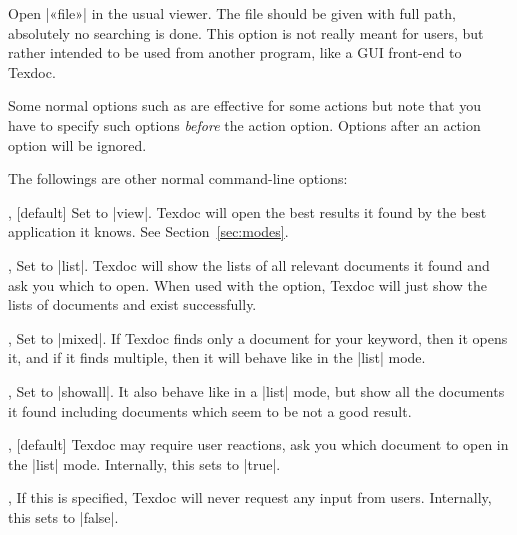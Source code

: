 \documentclass{texdoc-doc}
\begin{document}
\begin{clopt}{}
Open |«file»| in the usual viewer. The file should be given with full path,
absolutely no searching is done. This option is not really meant for users,
but rather intended to be used from another program, like a GUI front-end to
Texdoc.
\end{clopt}

Some normal options such as  are effective for some actions but note
that you have to specify such options \emph{before} the action option. Options
after an action option will be ignored.

The followings are other normal command-line options:

\begin{clopt}{, }[default]
Set  to |view|. Texdoc will open the best results it found by the best
application it knows. See Section~\ref{sec:modes}.
\end{clopt}

\begin{clopt}{, }
Set  to |list|. Texdoc will show the lists of all relevant documents
it found and ask you which to open. When used with the 
option, Texdoc will just show the lists of documents and exist successfully.
\end{clopt}

\begin{clopt}{, }
Set  to |mixed|. If Texdoc finds only a document for your keyword,
then it opens it, and if it finds multiple, then it will behave like in the
|list| mode.
\end{clopt}

\begin{clopt}{, }
Set  to |showall|. It also behave like in a |list| mode, but show all
the documents it found including documents which seem to be not a good result.
\end{clopt}

\begin{clopt}{, }[default]
Texdoc may require user reactions, \eg ask you which document to open in the
|list| mode. Internally, this sets  to |true|.
\end{clopt}

\begin{clopt}{, }
If this is specified, Texdoc will never request any input from users.
Internally, this sets  to |false|.
\end{clopt}
\end{document}
